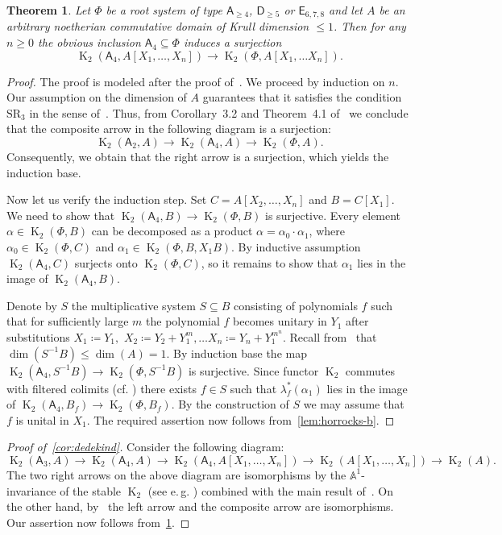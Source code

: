 \documentclass[oneside, 10pt]{amsart}
\DeclareMathOperator{\K}{K}
\newcommand{\rA}{\mathsf{A}}
\newcommand{\rD}{\mathsf{D}}
\newcommand{\rE}{\mathsf{E}}
\newtheorem{thm}{Theorem}
\numberwithin{equation}{section}
\numberwithin{thm}{section}
\numberwithin{lemma}{section}
\theoremstyle{definition}
\theoremstyle{remark}
\begin{document}
\begin{thm}\label{thm:early-stability}
Let $\Phi$ be a root system of type $\rA_{\geq 4}$, $\rD_{\geq 5}$ or $\rE_{6,7,8}$ and let $A$ be an arbitrary noetherian commutative
domain of Krull dimension $\leq 1$.
Then for any $n \geq 0$ the obvious inclusion $\rA_4 \subseteq \Phi$ induces a surjection
\[\K_2(\rA_4, A[X_1,\ldots, X_n]) \to \K_2(\Phi, A[X_1, \ldots X_n]).\]
\end{thm}
\begin{proof}
The proof is modeled after the proof of~\cite[Theorem~5.3]{Tu83}.
We proceed by induction on $n$.
Our assumption on the dimension of $A$ guarantees that it satisfies the condition $\mathrm{SR}_3$ in the sense of~\cite{St78}.
Thus, from Corollary~3.2 and Theorem~4.1 of~\cite{St78} we conclude that the composite arrow in the following diagram is a surjection:
\[\K_2(\rA_2, A) \to \K_2(\rA_4, A) \to \K_2(\Phi, A).\]
Consequently, we obtain that the right arrow is a surjection, which yields the induction base.

Now let us verify the induction step.
Set $C = A[X_2, \ldots , X_n]$ and $B = C[X_1]$.
We need to show that $\K_2(\rA_4, B) \to \K_2(\Phi, B)$ is surjective.
Every element $\alpha \in \K_2(\Phi, B)$ can be decomposed as a product $\alpha = \alpha_0 \cdot \alpha_1$,
where $\alpha_0 \in \K_2(\Phi, C)$ and $\alpha_1 \in \K_2(\Phi, B, X_1 B)$.
By inductive assumption $\K_2(\rA_4, C)$ surjects onto $\K_2(\Phi, C)$, so it remains to show that $\alpha_1$ lies in the image of $\K_2(\rA_4, B)$.

Denote by $S$ the multiplicative system $S \subseteq B$ consisting of polynomials $f$ such that for sufficiently large $m$
the polynomial $f$ becomes unitary in $Y_1$ after substitutions $X_1 \coloneqq Y_1,$ $X_2 \coloneqq Y_2 + Y_1^m, \ldots X_n \coloneqq Y_n + Y_1^{m^n}$.
Recall from~\cite[\S~6]{Su77} that $\dim(S^{-1}B) \leq \dim(A) = 1$.
By induction base the map $\K_2(\rA_4, S^{-1}B) \to \K_2(\Phi, S^{-1}B)$ is surjective.
Since functor $\K_2$ commutes with filtered colimits (cf. \cite[Lemma~3.3]{LSV2}) there exists $f \in S$ such that $\lambda^*_f(\alpha_1)$ lies in the image of $\K_2(\rA_4, B_f) \to \K_2(\Phi, B_f)$.
By the construction of $S$ we may assume that $f$ is unital in $X_1$.
The required assertion now follows from~\cref{lem:horrocks-b}.
\end{proof}


\begin{proof}[Proof of~\cref{cor:dedekind}]
Consider the following diagram:
\[ \K_2(\rA_3, A) \to \K_2(\rA_4, A) \to \K_2(\rA_4, A[X_1, \ldots, X_n]) \rightarrow \K_2(A[X_1, \ldots, X_n]) \to \K_2(A).\]
The two right arrows on the above diagram are isomorphisms by the $\mathbb{A}^1$-invariance of the stable $\K_2$
(see e.\,g. \cite[Theorem~V.6.3]{Kbook}) combined with the main result of~\cite{Tu83}.
On the other hand, by~\cite[Corollary~3.2]{ST76} the left arrow and the composite arrow are isomorphisms.
Our assertion now follows from~\cref{thm:early-stability}.
\end{proof}

\printbibliography
\end{document}
